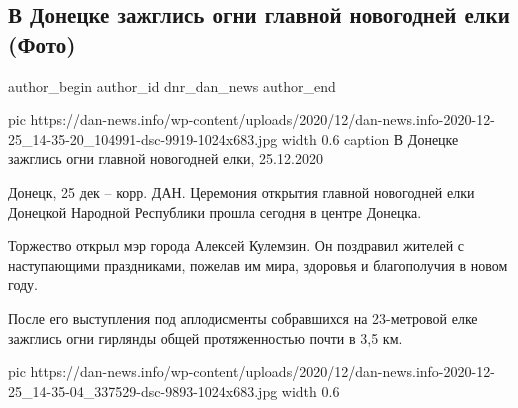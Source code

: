  
 
 
 
 
 
\subsection{В Донецке зажглись огни главной новогодней елки (Фото)}
\label{sec:25_12_2020.news.dnr.dan.dnr_dan_news.1.elka_donetsk}
\ifcmt
	author_begin
   author_id dnr_dan_news
	author_end
\fi

\ifcmt
  pic https://dan-news.info/wp-content/uploads/2020/12/dan-news.info-2020-12-25_14-35-20_104991-dsc-9919-1024x683.jpg
  width 0.6
	caption В Донецке зажглись огни главной новогодней елки, 25.12.2020
\fi

Донецк, 25 дек – корр. ДАН. Церемония открытия главной новогодней елки Донецкой
Народной Республики прошла сегодня в центре Донецка.

Торжество открыл мэр города Алексей Кулемзин. Он поздравил жителей с
наступающими праздниками, пожелав им мира, здоровья и благополучия в новом
году.

После его выступления под аплодисменты собравшихся на 23-метровой елке зажглись
огни гирлянды общей протяженностью почти в 3,5 км.

\ifcmt
  pic https://dan-news.info/wp-content/uploads/2020/12/dan-news.info-2020-12-25_14-35-04_337529-dsc-9893-1024x683.jpg
  width 0.6
\fi


